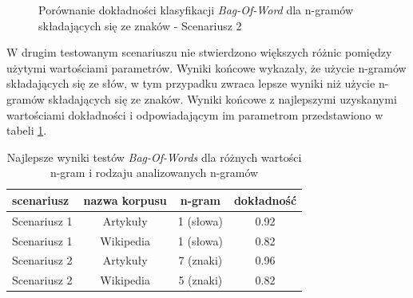 \begin{figure}[ht!]
	\centering
    \qquad
	\caption{Porównanie dokładności klasyfikacji \textit{Bag-Of-Word} dla n-gramów składających się ze znaków - Scenariusz 2}
    \label{fig:bow-ngram-compare-char}
\end{figure}

W drugim testowanym scenariuszu nie stwierdzono większych różnic pomiędzy użytymi wartościami parametrów. Wyniki końcowe wykazały, że użycie n-gramów składających się ze słów, w tym przypadku zwraca lepsze wyniki niż użycie n-gramów składających się ze znaków. Wyniki końcowe z najlepszymi uzyskanymi wartościami dokładności i odpowiadającym im parametrom przedstawiono w tabeli \ref{tab:bow-scenario-results}.

\begin{table}[]
\centering
\caption{Najlepsze wyniki testów \textit{Bag-Of-Words} dla różnych wartości n-gram i rodzaju analizowanych n-gramów}
\label{tab:bow-scenario-results}
\begin{tabular}{|l|c|c|c|}
\hline
scenariusz & nazwa korpusu                         & n-gram & dokładność \\ \hline
Scenariusz 1                     & Artykuły                       & 1 (słowa)     & 0.92                            \\ \hline
Scenariusz 1                     & Wikipedia & 1 (słowa)     & 0.82                            \\ \hline
Scenariusz 2                     & Artykuły  & 7 (znaki)      & 0.96                            \\ \hline
Scenariusz 2                     & Wikipedia                      & 5 (znaki)      & 0.82                            \\ \hline
\end{tabular}
\end{table}


